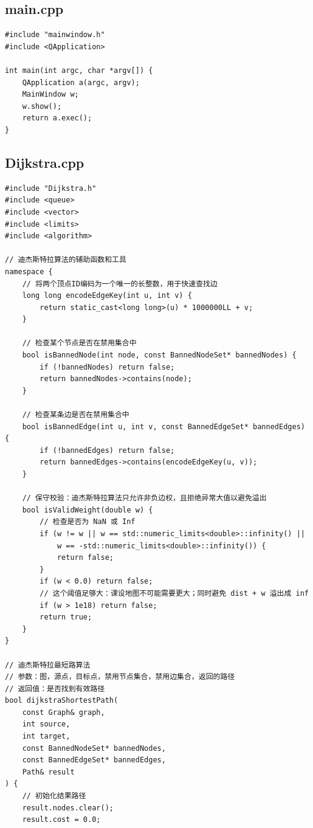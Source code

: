 \documentclass[UTF8,12pt,a4paper]{ctexart}
\begin{document}
\subsection{main.cpp}

\begin{lstlisting}[caption={main.cpp 主函数源码}]
#include "mainwindow.h"
#include <QApplication>

int main(int argc, char *argv[]) {
    QApplication a(argc, argv);
    MainWindow w;
    w.show();
    return a.exec();
}
\end{lstlisting}

\subsection{Dijkstra.cpp}

\begin{lstlisting}[caption={Dijkstra.cpp源码}]
#include "Dijkstra.h"
#include <queue>
#include <vector>
#include <limits>
#include <algorithm>

// 迪杰斯特拉算法的辅助函数和工具
namespace {
    // 将两个顶点ID编码为一个唯一的长整数，用于快速查找边
    long long encodeEdgeKey(int u, int v) {
        return static_cast<long long>(u) * 1000000LL + v;
    }

    // 检查某个节点是否在禁用集合中
    bool isBannedNode(int node, const BannedNodeSet* bannedNodes) {
        if (!bannedNodes) return false;
        return bannedNodes->contains(node);
    }

    // 检查某条边是否在禁用集合中
    bool isBannedEdge(int u, int v, const BannedEdgeSet* bannedEdges) {
        if (!bannedEdges) return false;
        return bannedEdges->contains(encodeEdgeKey(u, v));
    }

    // 保守校验：迪杰斯特拉算法只允许非负边权，且拒绝异常大值以避免溢出
    bool isValidWeight(double w) {
        // 检查是否为 NaN 或 Inf
        if (w != w || w == std::numeric_limits<double>::infinity() || 
            w == -std::numeric_limits<double>::infinity()) {
            return false;
        }
        if (w < 0.0) return false;
        // 这个阈值足够大：课设地图不可能需要更大；同时避免 dist + w 溢出成 inf
        if (w > 1e18) return false;
        return true;
    }
}

// 迪杰斯特拉最短路算法
// 参数：图，源点，目标点，禁用节点集合，禁用边集合，返回的路径
// 返回值：是否找到有效路径
bool dijkstraShortestPath(
    const Graph& graph,
    int source,
    int target,
    const BannedNodeSet* bannedNodes,
    const BannedEdgeSet* bannedEdges,
    Path& result
) {
    // 初始化结果路径
    result.nodes.clear();
    result.cost = 0.0;


\end{lstlisting}
\end{document}
